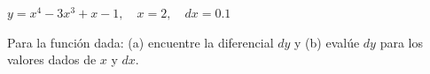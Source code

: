 \item $y = x^4 - 3x^3 + x - 1, \quad x = 2, \quad dx = 0.1$
\par
Para la función dada: (a) encuentre la diferencial $dy$ y (b) evalúe $dy$ para los valores dados de $x$ y $dx$.
